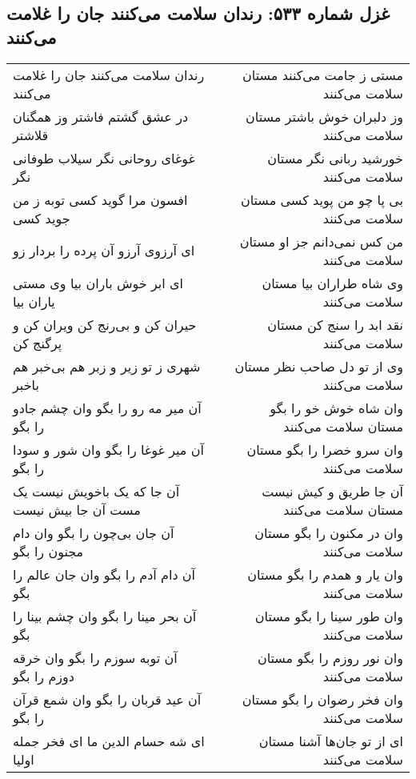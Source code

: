 \begin{center}
\section*{غزل شماره ۵۳۳: رندان سلامت می‌کنند جان را غلامت می‌کنند}
\label{sec:0533}
\begin{longtable}{l p{0.5cm} r}
رندان سلامت می‌کنند جان را غلامت می‌کنند
&&
مستی ز جامت می‌کنند مستان سلامت می‌کنند
\\
در عشق گشتم فاشتر وز همگنان قلاشتر
&&
وز دلبران خوش باشتر مستان سلامت می‌کنند
\\
غوغای روحانی نگر سیلاب طوفانی نگر
&&
خورشید ربانی نگر مستان سلامت می‌کنند
\\
افسون مرا گوید کسی توبه ز من جوید کسی
&&
بی پا چو من پوید کسی مستان سلامت می‌کنند
\\
ای آرزوی آرزو آن پرده را بردار زو
&&
من کس نمی‌دانم جز او مستان سلامت می‌کنند
\\
ای ابر خوش باران بیا وی مستی یاران بیا
&&
وی شاه طراران بیا مستان سلامت می‌کنند
\\
حیران کن و بی‌رنج کن ویران کن و پرگنج کن
&&
نقد ابد را سنج کن مستان سلامت می‌کنند
\\
شهری ز تو زیر و زبر هم بی‌خبر هم باخبر
&&
وی از تو دل صاحب نظر مستان سلامت می‌کنند
\\
آن میر مه رو را بگو وان چشم جادو را بگو
&&
وان شاه خوش خو را بگو مستان سلامت می‌کنند
\\
آن میر غوغا را بگو وان شور و سودا را بگو
&&
وان سرو خضرا را بگو مستان سلامت می‌کنند
\\
آن جا که یک باخویش نیست یک مست آن جا بیش نیست
&&
آن جا طریق و کیش نیست مستان سلامت می‌کنند
\\
آن جان بی‌چون را بگو وان دام مجنون را بگو
&&
وان در مکنون را بگو مستان سلامت می‌کنند
\\
آن دام آدم را بگو وان جان عالم را بگو
&&
وان یار و همدم را بگو مستان سلامت می‌کنند
\\
آن بحر مینا را بگو وان چشم بینا را بگو
&&
وان طور سینا را بگو مستان سلامت می‌کنند
\\
آن توبه سوزم را بگو وان خرقه دوزم را بگو
&&
وان نور روزم را بگو مستان سلامت می‌کنند
\\
آن عید قربان را بگو وان شمع قرآن را بگو
&&
وان فخر رضوان را بگو مستان سلامت می‌کنند
\\
ای شه حسام الدین ما ای فخر جمله اولیا
&&
ای از تو جان‌ها آشنا مستان سلامت می‌کنند
\\
\end{longtable}
\end{center}
